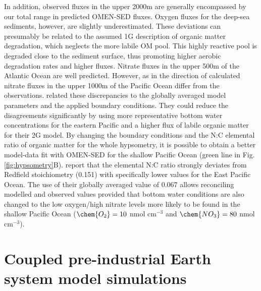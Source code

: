 \documentclass[gmd, manuscript]{copernicus}
\begin{document}
In addition, observed  fluxes in the upper 2000m are generally encompassed by our total range in predicted OMEN-SED fluxes. Oxygen fluxes for the deep-sea sediments, however, are slightly underestimated. 
These deviations can presumably be related to the assumed 1G description of organic matter degradation, which neglects the more labile OM pool. This highly reactive pool is degraded close to the sediment surface, 
thus promoting higher aerobic degradation rates and higher  fluxes.  
Nitrate fluxes in the upper 500m of the Atlantic Ocean are well predicted. However, as in \citet{middelburg_denitrification_1996} the direction of calculated nitrate fluxes in the upper 1000m of the Pacific Ocean differ from the observations. 
\citet{middelburg_denitrification_1996} related these discrepancies to the globally averaged model parameters and the applied boundary conditions. They could reduce the disagreements significantly by using more representative 
bottom water concentrations for the eastern Pacific and a higher flux of labile organic matter for their 2G model. By changing the boundary conditions and the N:C elemental ratio of organic matter for the whole hypsometry, it is possible 
to obtain a better model-data fit with OMEN-SED for the shallow Pacific Ocean (green line in Fig. \ref{fig:hypsometry}B). 
\citet{bohlen_simple_2012} report that the elemental N:C ratio strongly deviates from Redfield stoichiometry (0.151) with specifically lower values for the East Pacific Ocean. The use of their globally averaged value of 0.067 allows 
reconciling modelled and observed values provided that bottom water conditions are also changed to the low oxygen/high nitrate levels more likely to be found in the shallow Pacific Ocean 
($\chem{O_2} = 10$ nmol cm$^{-3}$ and $\chem{NO_3} = 80$ nmol cm$^{-3}$). 


\section{Coupled pre-industrial Earth system model simulations}\label{sec:ESM_coupling}
\end{document}
